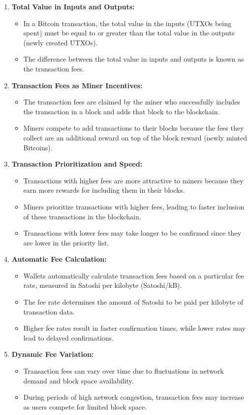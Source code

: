 \begin{enumerate}
	\item \textbf{Total Value in Inputs and Outputs:} 
	\begin{itemize}
		\item In a Bitcoin transaction, the total value in the inputs (UTXOs being spent) must be equal to or greater than the total value in the outputs (newly created UTXOs).
		\item The difference between the total value in inputs and outputs is known as the transaction fees.
	\end{itemize}
	\item \textbf{Transaction Fees as Miner Incentives:}
	\begin{itemize}
		\item The transaction fees are claimed by the miner who successfully includes the transaction in a block and adds that block to the blockchain.
		\item Miners compete to add transactions to their blocks because the fees they collect are an additional reward on top of the block reward (newly minted Bitcoins).
	\end{itemize}
	\item \textbf{Transaction Prioritization and Speed:}
	\begin{itemize}
		\item Transactions with higher fees are more attractive to miners because they earn more rewards for including them in their blocks.
		\item Miners prioritize transactions with higher fees, leading to faster inclusion of these transactions in the blockchain.
		\item Transactions with lower fees may take longer to be confirmed since they are lower in the priority list.
	\end{itemize}
	\item \textbf{Automatic Fee Calculation:}
	\begin{itemize}
		\item Wallets automatically calculate transaction fees based on a particular fee rate, measured in Satoshi per kilobyte (Satoshi/kB).
		\item The fee rate determines the amount of Satoshi to be paid per kilobyte of transaction data.
		\item Higher fee rates result in faster confirmation times, while lower rates may lead to delayed confirmations.
	\end{itemize}
	\item \textbf{Dynamic Fee Variation:}
	\begin{itemize}
		\item Transaction fees can vary over time due to fluctuations in network demand and block space availability.
		\item During periods of high network congestion, transaction fees may increase as users compete for limited block space.
	\end{itemize}
\end{enumerate}

